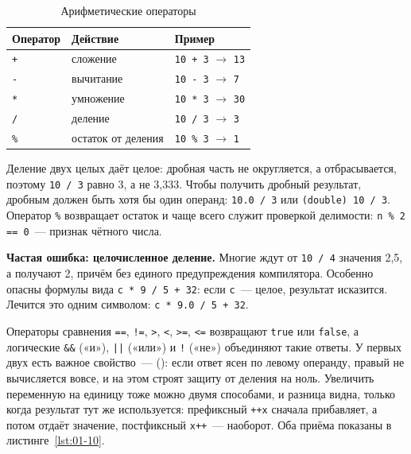 \begin{table}[htbp]
\caption{Арифметические операторы}
\label{tab:01-4}
\centering
\begin{tabular}{L{2.3cm}L{6.6cm}L{5.1cm}}
\toprule
Оператор & Действие & Пример \\
\midrule
\texttt{+} & сложение & \texttt{10 + 3} $\to$ \texttt{13} \\
\texttt{-} & вычитание & \texttt{10 - 3} $\to$ \texttt{7} \\
\texttt{*} & умножение & \texttt{10 * 3} $\to$ \texttt{30} \\
\texttt{/} & деление & \texttt{10 / 3} $\to$ \texttt{3} \\
\texttt{\%} & остаток от деления & \texttt{10 \% 3} $\to$ \texttt{1} \\
\bottomrule
\end{tabular}
\end{table}

Деление двух целых даёт целое: дробная часть не округляется, а отбрасывается,
поэтому \texttt{10 / 3} равно 3, а не 3,333. Чтобы получить дробный результат,
дробным должен быть хотя бы один операнд: \texttt{10.0 / 3} или
\texttt{(double) 10 / 3}. Оператор \texttt{\%} возвращает остаток и чаще всего
служит проверкой делимости: \texttt{n \% 2 == 0}~--- признак чётного числа.

\begin{oshibka}
\textbf{Частая ошибка: целочисленное деление.} Многие ждут от \texttt{10 / 4}
значения 2,5, а получают 2, причём без единого предупреждения компилятора.
Особенно опасны формулы вида \texttt{c * 9 / 5 + 32}: если \texttt{c}~--- целое,
результат исказится. Лечится это одним символом: \texttt{c * 9.0 / 5 + 32}.
\end{oshibka}

Операторы сравнения \texttt{==}, \texttt{!=}, \texttt{>}, \texttt{<},
\texttt{>=}, \texttt{<=} возвращают \texttt{true} или \texttt{false}, а
логические \texttt{\&\&} («и»), \texttt{||} («или») и \texttt{!} («не»)
объединяют такие ответы. У первых двух есть важное свойство~---  (): если ответ ясен по левому операнду, правый не
вычисляется вовсе, и на этом строят защиту от деления на ноль. Увеличить
переменную на единицу тоже можно двумя способами, и разница видна, только когда
результат тут же используется: префиксный \texttt{++x} сначала прибавляет, а
потом отдаёт значение, постфиксный \texttt{x++}~--- наоборот. Оба приёма
показаны в листинге~\ref{lst:01-10}.

